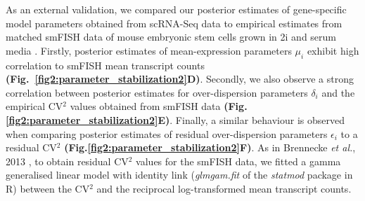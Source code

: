 As an external validation, we compared our posterior estimates of gene-specific model parameters obtained from scRNA-Seq data to empirical estimates from matched smFISH data of mouse embryonic stem cells grown in 2i and serum media \citep{Grun2014}. Firstly, posterior estimates of mean-expression parameters $\mu_i$ exhibit high correlation to smFISH mean transcript counts \textbf{(Fig.~\ref{fig2:parameter_stabilization2}D)}. Secondly, we also observe a strong correlation between posterior estimates for over-dispersion parameters $\delta_i$ and the empirical CV$^2$ values obtained from smFISH data \textbf{(Fig.\ref{fig2:parameter_stabilization2}E)}. Finally, a similar behaviour is observed when comparing posterior estimates of residual over-dispersion parameters $\epsilon_i$ to a residual CV$^2$ \textbf{(Fig.\ref{fig2:parameter_stabilization2}F)}. As in Brennecke \emph{et al.}, 2013 \cite{Brennecke2013}, to obtain residual CV$^2$ values for the smFISH data, we fitted a gamma generalised linear model with identity link (\textit{glmgam.fit} of the \textit{statmod} package in R) between the CV$^2$ and the reciprocal log-transformed mean transcript counts.

